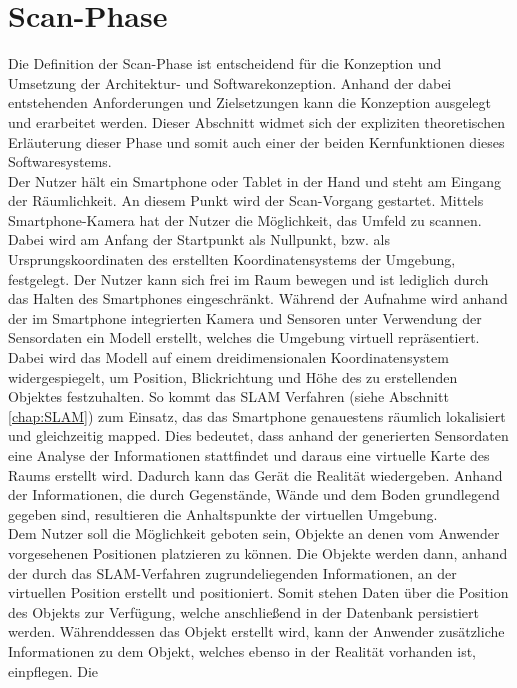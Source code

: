 \section{Scan-Phase}
\label{chap:Scan-Phase} %
Die Definition der Scan-Phase ist entscheidend für die Konzeption und Umsetzung der Architektur- und Softwarekonzeption. 
Anhand der dabei entstehenden Anforderungen und Zielsetzungen kann die Konzeption ausgelegt und erarbeitet werden. Dieser Abschnitt widmet 
sich der expliziten theoretischen Erläuterung dieser Phase und somit auch einer der beiden Kernfunktionen dieses Softwaresystems.
\\ 
\linebreak
Der Nutzer hält ein Smartphone oder Tablet in der Hand und steht am Eingang der Räumlichkeit. An diesem Punkt wird der Scan-Vorgang gestartet. 
Mittels Smartphone-Kamera hat der Nutzer die Möglichkeit, das Umfeld zu scannen. Dabei wird am Anfang der Startpunkt als Nullpunkt, bzw. 
als Ursprungskoordinaten des erstellten Koordinatensystems der Umgebung, festgelegt. Der Nutzer kann sich frei im Raum bewegen und ist lediglich 
durch das Halten des Smartphones eingeschränkt. Während der Aufnahme wird anhand der im Smartphone integrierten Kamera und 
Sensoren unter Verwendung der Sensordaten ein Modell erstellt, welches die Umgebung virtuell repräsentiert. Dabei wird das Modell auf 
einem dreidimensionalen Koordinatensystem widergespiegelt, um Position, Blickrichtung und Höhe des zu erstellenden Objektes festzuhalten. 
So kommt das \acl{SLAM} Verfahren (siehe Abschnitt \ref{chap:SLAM}) zum Einsatz, das das Smartphone genauestens räumlich lokalisiert und 
gleichzeitig mapped. Dies bedeutet, dass anhand der generierten Sensordaten eine Analyse der Informationen stattfindet und daraus eine 
virtuelle Karte des Raums erstellt wird. Dadurch kann das Gerät die Realität wiedergeben. Anhand der Informationen, die durch
Gegenstände, Wände und dem Boden grundlegend gegeben sind, resultieren die Anhaltspunkte der virtuellen Umgebung. 
\\ 
Dem Nutzer soll die Möglichkeit geboten sein, Objekte an denen vom Anwender vorgesehenen Positionen platzieren zu können. Die Objekte werden 
dann, anhand der durch das \acs{SLAM}-Verfahren zugrundeliegenden Informationen, an der virtuellen Position erstellt und positioniert. Somit 
stehen Daten über die Position des Objekts zur Verfügung, welche anschließend in der Datenbank persistiert werden. Währenddessen das Objekt 
erstellt wird, kann der Anwender zusätzliche Informationen zu dem Objekt, welches ebenso in der Realität vorhanden ist, einpflegen. Die 
